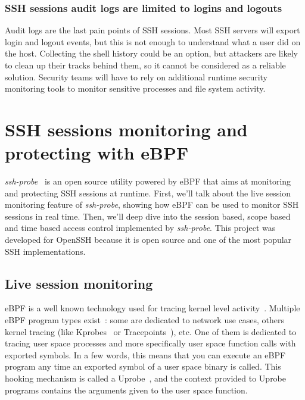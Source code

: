 \subsubsection{SSH sessions audit logs are limited to logins and logouts}

Audit logs are the last pain points of SSH sessions.
Most SSH servers will export login and logout events, but this is not enough to understand what a user did on the host.
Collecting the shell history could be an option, but attackers are likely to clean up their tracks behind them, so it cannot be considered as a reliable solution.
Security teams will have to rely on additional runtime security monitoring tools to monitor sensitive processes and file system activity.

\section{SSH sessions monitoring and protecting with eBPF}

\emph{ssh-probe}~\cite{MonitoringAndProtectingSSHSessionsWithEBPF:SSHProbe} is an open source utility powered by eBPF that aims at monitoring and protecting SSH sessions at runtime.
First, we’ll talk about the live session monitoring feature of \emph{ssh-probe}, showing how eBPF can be used to monitor SSH sessions in real time.
Then, we’ll deep dive into the session based, scope based and time based access control implemented by \emph{ssh-probe}.
This project was developed for OpenSSH because it is open source and one of the most popular SSH implementations.

\subsection{Live session monitoring}

eBPF is a well known technology used for tracing kernel level activity~\cite{MonitoringAndProtectingSSHSessionsWithEBPF:BrendanGregg}.
Multiple eBPF program types exist~\cite{MonitoringAndProtectingSSHSessionsWithEBPF:LorenzoDavid}: some are dedicated to network use cases, others kernel tracing (like Kprobes~\cite{MonitoringAndProtectingSSHSessionsWithEBPF:Kprobes} or Tracepoints~\cite{MonitoringAndProtectingSSHSessionsWithEBPF:Tracepoints}), etc.
One of them is dedicated to tracing user space processes and more specifically user space function calls with exported symbols.
In a few words, this means that you can execute an eBPF program any time an exported symbol of a user space binary is called.
This hooking mechanism is called a Uprobe~\cite{MonitoringAndProtectingSSHSessionsWithEBPF:Uprobes}, and the context provided to Uprobe programs contains the arguments given to the user space function.

